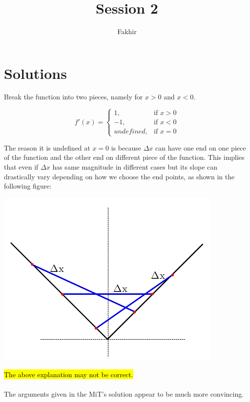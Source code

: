 \documentclass[]{article}
\title{Session 2}
\author{Fakhir}
\DeclareRobustCommand{\hlred}[1]{{\sethlcolor{red}\hl{#1}}}
\begin{document}
\maketitle

\section*{Solutions}

Break the function into two pieces, namely for $x>0$ and $x<0$. 

\[
f'(x)= 
\begin{cases}
1, & \text{if } x>0 \\
-1,& \text{if } x<0 \\
undefined, & \text{if } x=0
\end{cases}
\]

The reason it is undefined at $x=0$ is because $\Delta x$ can have one end on one piece of the function and the other end on different piece of the function. This implies that even if $\Delta x$ has same magnitude in different cases but its slope can drastically vary depending on how we choose the end points, as shown in the following figure:

\begin{center}
	\includegraphics[scale=1]{images/section1_1}
\end{center}

\hlred{The above explanation may not be correct.} \\~\\

The arguments given in the MiT's solution appear to be much more convincing.
\end{document}
